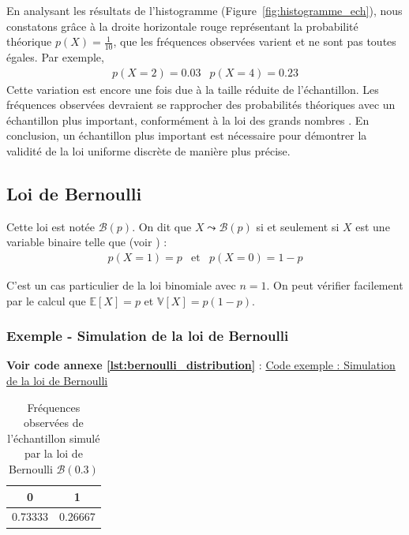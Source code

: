   En analysant les résultats de l'histogramme (Figure~\ref{fig:histogramme_ech}), nous constatons grâce à la droite horizontale rouge représentant la probabilité théorique $p(X)=\frac{1}{10}$, que les fréquences observées varient et ne sont pas toutes égales. Par exemple, 
  \[
    \begin{array}{cc}
      p(X=2) = 0.03 & p(X=4) = 0.23
    \end{array}
  \]
  Cette variation est encore une fois due à la taille réduite de l'échantillon. Les fréquences observées devraient se rapprocher des probabilités théoriques avec un échantillon plus important, conformément à la loi des grands nombres \cite{lawoflargeNumbers}. 
  En conclusion, un échantillon plus important est nécessaire pour démontrer la validité de la loi uniforme discrète de manière plus précise.

\subsection{Loi de Bernoulli}
  Cette loi est notée $\mathcal B(p)$. On dit que $X\leadsto \mathcal B(p)$ si et seulement si $X$ est une variable binaire telle que (voir \cite{bernoulliLaw}) :
  \begin{equation}
    \begin{array}{ccc}
      p(X=1) = p & \text{et} & p(X=0) = 1-p
    \end{array}
  \end{equation}  

  C’est un cas particulier de la loi binomiale avec $n=1$. On peut vérifier facilement par le calcul que $\mathbb E[X]=p$ et $\mathbb V[X]=p(1-p)$.

\subsubsection{Exemple - Simulation de la loi de Bernoulli}

  \textbf{Voir code annexe \ref{lst:bernoulli_distribution}} : \hyperlink{\ref{lst:bernoulli_distribution}}{Code exemple : Simulation de la loi de Bernoulli}

\begin{table}[H]
  \centering
  \begin{tabular}{c c}
    \toprule
    0 & 1 \\
    \midrule
    0.73333 & 0.26667 \\
    \bottomrule
  \end{tabular}
  \caption{Fréquences observées de l'échantillon simulé par la loi de Bernoulli $\mathcal B(0.3)$}
  \label{tab:bernoulli}
\end{table}



